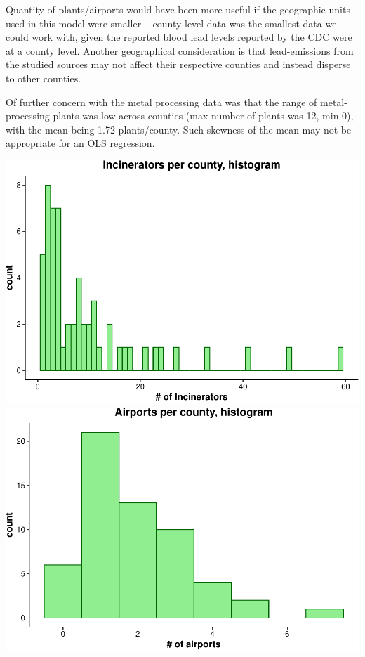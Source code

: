 \documentclass[
  12pt,
]{article}
\begin{document}
Quantity of plants/airports would have been more useful if the
geographic units used in this model were smaller -- county-level data
was the smallest data we could work with, given the reported blood lead
levels reported by the CDC were at a county level. Another geographical
consideration is that lead-emissions from the studied sources may not
affect their respective counties and instead disperse to other counties.

Of further concern with the metal processing data was that the range of
metal-processing plants was low across counties (max number of plants
was 12, min 0), with the mean being 1.72 plants/county. Such skewness of
the mean may not be appropriate for an OLS regression.

\includegraphics{Alcorn_Bao_Hermanson_ENV872_Project_files/figure-latex/setuping section-1.pdf}
\includegraphics{Alcorn_Bao_Hermanson_ENV872_Project_files/figure-latex/setuping section-2.pdf}
\end{document}
